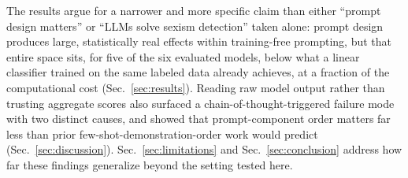 The results argue for a narrower and more specific claim than either
``prompt design matters'' or ``LLMs solve sexism detection'' taken
alone: prompt design produces large, statistically real effects within
training-free prompting, but that entire space sits, for five of the
six evaluated models, below what a linear classifier trained on the
same labeled data already achieves, at a fraction of the computational
cost (Sec.~\ref{sec:results}). Reading raw model output rather than
trusting aggregate scores also surfaced a chain-of-thought-triggered
failure mode with two distinct causes, and showed that prompt-component
order matters far less than prior few-shot-demonstration-order work
would predict (Sec.~\ref{sec:discussion}). Sec.~\ref{sec:limitations}
and Sec.~\ref{sec:conclusion} address how far these findings generalize
beyond the setting tested here.
